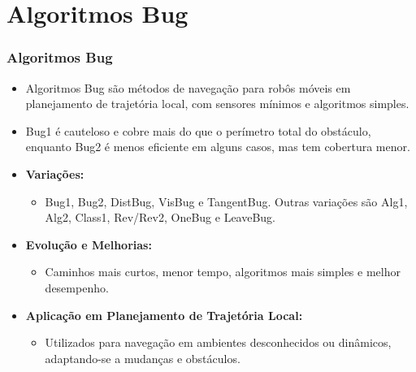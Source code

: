 \documentclass[xcolor=dvipsnames, aspectratio=169]{beamer}
\begin{document}
\section{Algoritmos Bug}
\begin{frame}[fragile]
  \frametitle{Algoritmos Bug}
  \begin{itemize}
    \item Algoritmos Bug são métodos de navegação para robôs móveis em planejamento de trajetória local, com sensores mínimos e algoritmos simples.
    \item Bug1 é cauteloso e cobre mais do que o perímetro total do obstáculo, enquanto Bug2 é menos eficiente em alguns casos, mas tem cobertura menor.
    \item \textbf{Variações:} 
    \begin{itemize}
      \item Bug1, Bug2, DistBug, VisBug e TangentBug. Outras variações são Alg1, Alg2, Class1, Rev/Rev2, OneBug e LeaveBug.
    \end{itemize}
    \item \textbf{Evolução e Melhorias:} 
    \begin{itemize}
      \item Caminhos mais curtos, menor tempo, algoritmos mais simples e melhor desempenho.
    \end{itemize}
    \item \textbf{Aplicação em Planejamento de Trajetória Local:} 
    \begin{itemize}
      \item Utilizados para navegação em ambientes desconhecidos ou dinâmicos, adaptando-se a mudanças e obstáculos.
    \end{itemize}
  \end{itemize}

\end{frame}

\end{document}
